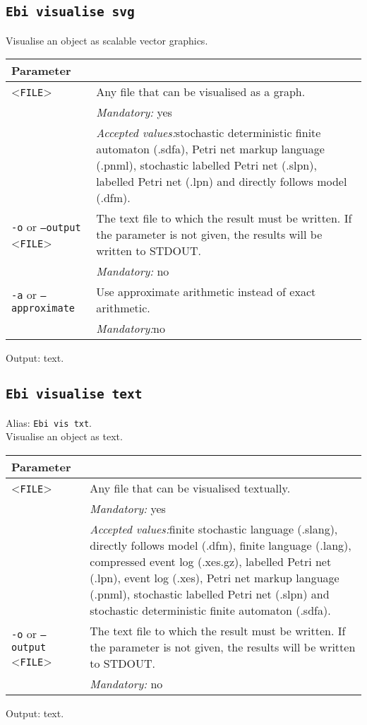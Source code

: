 {\subsection{\texttt{Ebi visualise svg}}
Visualise an object as scalable vector graphics.\\
\begin{tabularx}{\linewidth}{lX}
\toprule
Parameter \\\midrule
<\texttt{FILE}>&Any file that can be visualised as a graph.\\
&\textit{Mandatory:} \quad yes\\
&\textit{Accepted values:}\quad stochastic deterministic finite automaton (.sdfa), Petri net markup language (.pnml), stochastic labelled Petri net (.slpn), labelled Petri net (.lpn) and directly follows model (.dfm).\\
\texttt{-o} or \texttt{--output} <\texttt{FILE}> &
The text file to which the result must be written. If the parameter is not given, the results will be written to STDOUT.\\
&\textit{Mandatory:} \quad no\\
\texttt{-a} or \texttt{--approximate} & Use approximate arithmetic instead of exact arithmetic.\\
&\textit{Mandatory:}\quad no\\
\bottomrule
\end{tabularx}
Output: text.
\subsection{\texttt{Ebi visualise text}}
Alias: \texttt{Ebi vis txt}.\\
Visualise an object as text.\\
\begin{tabularx}{\linewidth}{lX}
\toprule
Parameter \\\midrule
<\texttt{FILE}>&Any file that can be visualised textually.\\
&\textit{Mandatory:} \quad yes\\
&\textit{Accepted values:}\quad finite stochastic language (.slang), directly follows model (.dfm), finite language (.lang), compressed event log (.xes.gz), labelled Petri net (.lpn), event log (.xes), Petri net markup language (.pnml), stochastic labelled Petri net (.slpn) and stochastic deterministic finite automaton (.sdfa).\\
\texttt{-o} or \texttt{--output} <\texttt{FILE}> &
The text file to which the result must be written. If the parameter is not given, the results will be written to STDOUT.\\
&\textit{Mandatory:} \quad no\\
\bottomrule
\end{tabularx}
Output: text.
}
